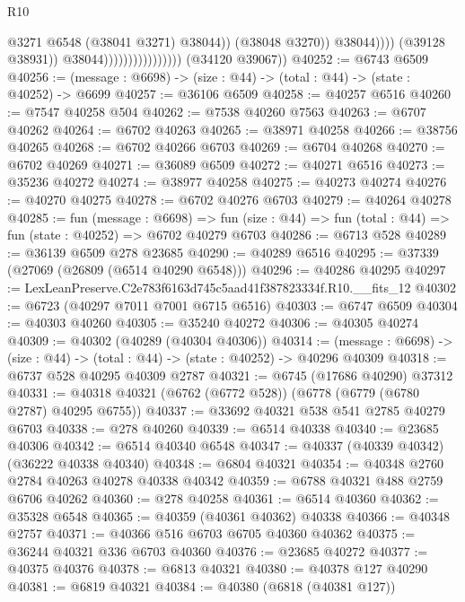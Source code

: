 \begin{lexlean}{R10}
\begin{coremodule}
                                                      @3271
                                                      @6548
                                                      (@38041 @3271)
                                                      @38044))
                                                  (@38048 @3270))
                                                @38044))))
                                        (@39128 @38931))
                                      @38044))))))))))))))))
      (@34120 @39067))
@40252 := @6743 @6509
@40256 := (message : @6698) -> (size : @44) -> (total : @44) -> (state : @40252) -> @6699
@40257 := @36106 @6509
@40258 := @40257 @6516
@40260 := @7547 @40258 @504
@40262 := @7538 @40260 @7563
@40263 := @6707 @40262
@40264 := @6702 @40263
@40265 := @38971 @40258
@40266 := @38756 @40265
@40268 := @6702 @40266 @6703
@40269 := @6704 @40268
@40270 := @6702 @40269
@40271 := @36089 @6509
@40272 := @40271 @6516
@40273 := @35236 @40272
@40274 := @38977 @40258
@40275 := @40273 @40274
@40276 := @40270 @40275
@40278 := @6702 @40276 @6703
@40279 := @40264 @40278
@40285 := fun (message : @6698) =>
  fun (size : @44) => fun (total : @44) => fun (state : @40252) => @6702 @40279 @6703
@40286 := @6713 @528
@40289 := @36139 @6509 @278 @23685
@40290 := @40289 @6516
@40295 := @37339 (@27069 (@26809 (@6514 @40290 @6548)))
@40296 := @40286 @40295
@40297 := LexLeanPreserve.C2e783f6163d745c5aad41f387823334f.R10.__fits_12
@40302 := @6723 (@40297 @7011 @7001 @6715 @6516)
@40303 := @6747 @6509
@40304 := @40303 @40260
@40305 := @35240 @40272
@40306 := @40305 @40274
@40309 := @40302 (@40289 (@40304 @40306))
@40314 := (message : @6698) -> (size : @44) -> (total : @44) -> (state : @40252) -> @40296 @40309
@40318 := @6737 @528 @40295 @40309 @2787
@40321 := @6745 (@17686 @40290) @37312
@40331 := @40318 @40321 (@6762 (@6772 @528)) (@6778 (@6779 (@6780 @2787) @40295 @6755))
@40337 := @33692 @40321 @538 @541 @2785 @40279 @6703
@40338 := @278 @40260
@40339 := @6514 @40338
@40340 := @23685 @40306
@40342 := @6514 @40340 @6548
@40347 := @40337 (@40339 @40342) (@36222 @40338 @40340)
@40348 := @6804 @40321
@40354 := @40348 @2760 @2784 @40263 @40278 @40338 @40342
@40359 := @6788 @40321 @488 @2759 @6706 @40262
@40360 := @278 @40258
@40361 := @6514 @40360
@40362 := @35328 @6548
@40365 := @40359 (@40361 @40362) @40338
@40366 := @40348 @2757
@40371 := @40366 @516 @6703 @6705 @40360 @40362
@40375 := @36244 @40321 @336 @6703 @40360
@40376 := @23685 @40272
@40377 := @40375 @40376
@40378 := @6813 @40321
@40380 := @40378 @127 @40290
@40381 := @6819 @40321
@40384 := @40380 (@6818 (@40381 @127))

\end{coremodule}
\end{lexlean}
